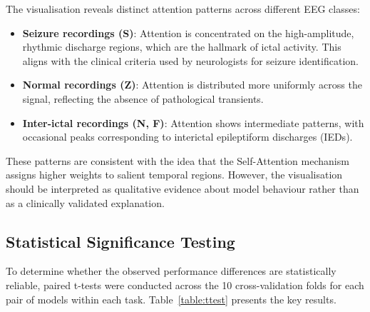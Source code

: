The visualisation reveals distinct attention patterns across different EEG classes:

\begin{itemize}
    \item \textbf{Seizure recordings (S)}: Attention is concentrated on the high-amplitude, rhythmic discharge regions, which are the hallmark of ictal activity. This aligns with the clinical criteria used by neurologists for seizure identification.
    \item \textbf{Normal recordings (Z)}: Attention is distributed more uniformly across the signal, reflecting the absence of pathological transients.
    \item \textbf{Inter-ictal recordings (N, F)}: Attention shows intermediate patterns, with occasional peaks corresponding to interictal epileptiform discharges (IEDs).
\end{itemize}

These patterns are consistent with the idea that the Self-Attention mechanism assigns higher weights to salient temporal regions. However, the visualisation should be interpreted as qualitative evidence about model behaviour rather than as a clinically validated explanation.

\subsection{Statistical Significance Testing}

To determine whether the observed performance differences are statistically reliable, paired t-tests were conducted across the 10 cross-validation folds for each pair of models within each task. Table~\ref{table:ttest} presents the key results.

